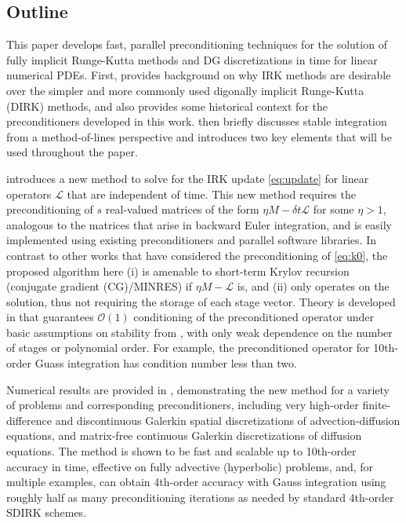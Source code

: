 \documentclass[review]{siamart}
\begin{document}
\subsection{Outline}\label{sec:intro:outline}

This paper develops fast, parallel preconditioning techniques for the solution of fully implicit
Runge-Kutta methods and DG discretizations in time for linear numerical PDEs. First,
 provides background on why IRK methods are desirable over the simpler and more
commonly used digonally implicit Runge-Kutta (DIRK) methods, and also provides some historical
context for the preconditioners developed in this work.  then briefly discusses
stable integration from a method-of-lines perspective and introduces two key elements that will be
used throughout the paper.

 introduces a new method to solve for the IRK update
\eqref{eq:update} for linear operators $\mathcal{L}$ that are independent of time.
This new method requires the preconditioning of $s$ real-valued matrices of the form
$\eta M - \delta t\mathcal{L}$ for some $\eta > 1$, analogous to the matrices that
arise in backward Euler integration, and is easily implemented
using existing preconditioners and parallel software libraries.
In contrast to other works that have considered the preconditioning of \eqref{eq:k0},
the proposed algorithm here (i) is amenable to short-term Krylov recursion (conjugate
gradient (CG)/MINRES) if $\eta M - \mathcal{L}$ is, and (ii) only operates on the solution,
thus not requiring the storage of each stage vector. Theory is developed in
 that guarantees $\mathcal{O}(1)$ conditioning of the
preconditioned operator under basic assumptions on stability from
, with only weak dependence on the number of
stages or polynomial order. For example, the preconditioned operator for
10th-order Guass integration has condition number less than two.

Numerical results are provided in , demonstrating the new
method for a variety of problems and corresponding preconditioners, including
very high-order finite-difference and discontinuous Galerkin spatial discretizations of
advection-diffusion equations, and matrix-free continuous Galerkin
discretizations of diffusion equations. The method is shown to be fast and scalable
up to 10th-order accuracy in time, effective on fully advective (hyperbolic)
problems, and, for multiple examples, can obtain 4th-order accuracy with Gauss
integration using roughly half as many preconditioning iterations
as needed by standard 4th-order SDIRK schemes.
\end{document}
